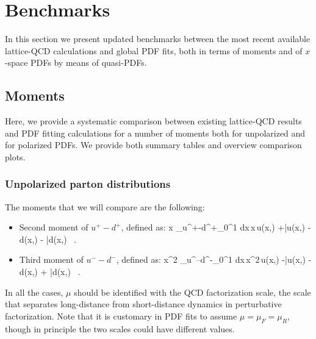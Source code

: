 \section{Benchmarks}
\label{sec:benchmarking}

In this section we present updated benchmarks between the most
recent available lattice-QCD calculations and global PDF fits,
both in terms of moments and of $x$-space PDFs by means of
quasi-PDFs.

\subsection{Moments}

Here, we provide a systematic comparison between existing
lattice-QCD results and PDF fitting calculations
for a number of moments both for unpolarized
and for polarized PDFs.
%
We provide both summary tables and overview comparison plots.

\subsubsection{Unpolarized parton distributions}

The moments that we will compare are the following:

\begin{itemize}

\item Second moment of $u^+-d^+$, defined as:
  \be
  \la x \ra_{u^+-d^+}\equiv \int_0^1 dx\,x\,\lc u(x,\mu)
  +\bar{u}(x,\mu)
-d(x,\mu) - \bar{d}(x,\mu) \, .
  \rc
  \ee

\item Third moment of $u^--d^-$, defined as:
  \be
  \la x^2 \ra_{u^--d^-}\equiv \int_0^1 dx\,x^2\,\lc u(x,\mu)
  -\bar{u}(x,\mu)
-d(x,\mu) + \bar{d}(x,\mu) \, .
  \rc
  \ee

  \end{itemize}

In all the cases, $\mu$ should be identified with the QCD
factorization scale, the scale that separates
long-distance from short-distance dynamics in perturbative
factorization.
%
Note that it is customary in PDF fits to assume
$\mu=\mu_F=\mu_R$, though in principle the two scales
could have different values.


